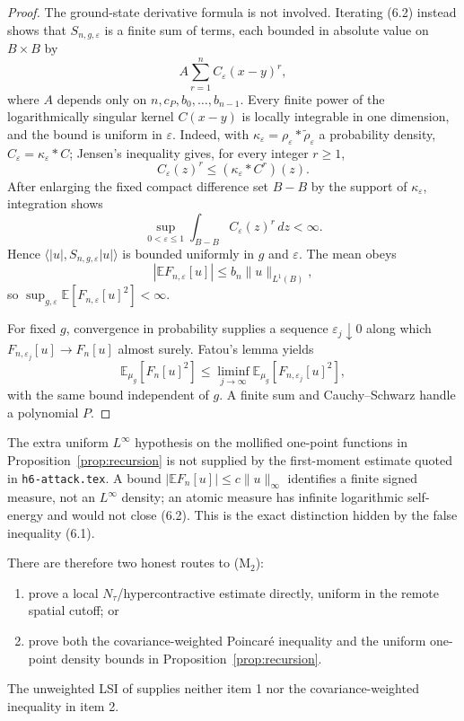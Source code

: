 \documentclass[11pt,a4paper]{article}
\theoremstyle{remark}
\newcommand{\E}{\mathbb E}
\begin{document}
\begin{proof}
The ground-state derivative formula is not involved.  Iterating (6.2) instead shows that
$S_{n,g,\varepsilon}$ is a finite sum of terms, each bounded in absolute value on
$B\times B$ by
\[
 A\sum_{r=1}^n C_\varepsilon(x-y)^r,
\]
where $A$ depends only on $n,c_P,b_0,\ldots,b_{n-1}$.  Every finite power of the logarithmically
singular kernel $C(x-y)$ is locally integrable in one dimension, and the bound is uniform in
$\varepsilon$.  Indeed, with
$\kappa_\varepsilon=\rho_\varepsilon*\widetilde\rho_\varepsilon$ a probability density,
$C_\varepsilon=\kappa_\varepsilon*C$; Jensen's inequality gives, for every integer $r\ge1$,
\[
 C_\varepsilon(z)^r\le(\kappa_\varepsilon*C^r)(z).
\]
After enlarging the fixed compact difference set $B-B$ by the support of $\kappa_\varepsilon$,
integration shows
\[
 \sup_{0<\varepsilon\le1}\int_{B-B}C_\varepsilon(z)^r\,dz<\infty.
\]
Hence $\langle |u|,S_{n,g,\varepsilon}|u|\rangle$ is bounded uniformly in $g$ and
$\varepsilon$.  The mean obeys
\[
 \left|\E F_{n,\varepsilon}[u]\right|
 \le b_n\|u\|_{L^1(B)},
\]
so $\sup_{g,\varepsilon}\E[F_{n,\varepsilon}[u]^2]<\infty$.

For fixed $g$, convergence in probability supplies a sequence $\varepsilon_j\downarrow0$ along
which $F_{n,\varepsilon_j}[u]\to F_n[u]$ almost surely.  Fatou's lemma yields
\[
 \E_{\mu_g}[F_n[u]^2]
 \le\liminf_{j\to\infty}\E_{\mu_g}[F_{n,\varepsilon_j}[u]^2],
\]
with the same bound independent of $g$.  A finite sum and Cauchy--Schwarz handle a polynomial
$P$.
\end{proof}

The extra uniform $L^\infty$ hypothesis on the mollified one-point functions in
Proposition~\ref{prop:recursion} is not supplied by
the first-moment estimate quoted in \texttt{h6-attack.tex}.  A bound
$|\E F_n[u]|\le c\|u\|_\infty$ identifies a finite signed measure, not an $L^\infty$ density;
an atomic measure has infinite logarithmic self-energy and would not close (6.2).  This is the
exact distinction hidden by the false inequality (6.1).

There are therefore two honest routes to (M$_2$):
\begin{enumerate}
\item prove a local $N_\tau$/hypercontractive estimate directly, uniform in the remote spatial
cutoff; or
\item prove both the covariance-weighted Poincar\'e inequality and the uniform one-point density
bounds in Proposition~\ref{prop:recursion}.
\end{enumerate}
The unweighted LSI of \cite{BD} supplies neither item 1 nor the covariance-weighted inequality in
item 2.
\end{document}
